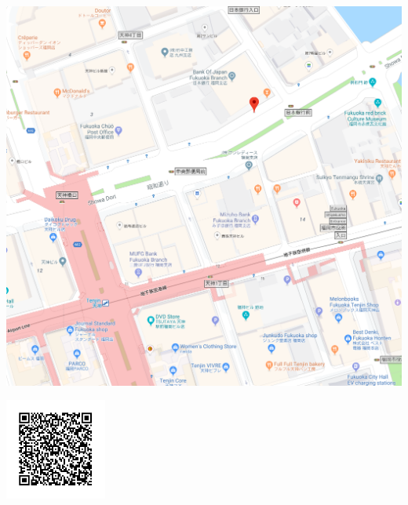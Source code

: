 \noindent\includegraphics[width=\textwidth]{tour_meeting_place.png}

\includegraphics[width=0.25\textwidth]{tour_meeting_place_qrcode.png}


